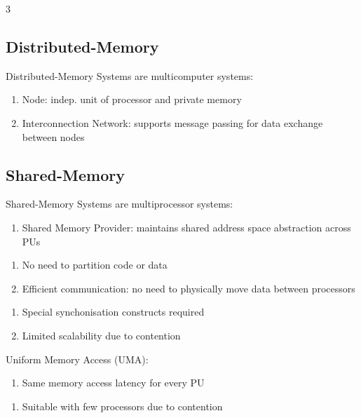 \documentclass[12pt, a4paper]{article}
\begin{document}
\begin{multicols*}{3}
\subsection{Distributed-Memory}
Distributed-Memory Systems are multicomputer systems:
\begin{enumerate}[\roman*.]
  \item Node: indep. unit of processor and private memory 
  \item Interconnection Network: supports message passing for data exchange between nodes
\end{enumerate}
\begin{center}
\end{center}
\colbreak

\subsection{Shared-Memory}
Shared-Memory Systems are multiprocessor systems:
\begin{enumerate}[\roman*.]
  \item Shared Memory Provider: maintains shared address space abstraction across PUs 
\end{enumerate}
\begin{enumerate}[$+$]\vspace{-2pt }
  \item No need to partition code or data
  \item Efficient communication: no need to physically move data between processors
\end{enumerate}
\begin{enumerate}[$-$]\vspace{-2pt }
  \item Special synchonisation constructs required 
  \item Limited scalability due to contention 
\end{enumerate}

Uniform Memory Access (UMA):
\begin{enumerate}[\roman*.]
  \item Same memory access latency for every PU
\end{enumerate}
\begin{enumerate}[$+$]\vspace{-2pt }
  \item Suitable with few processors due to contention
\end{enumerate}
{\centering
\par}


\end{multicols*}
\end{document}
